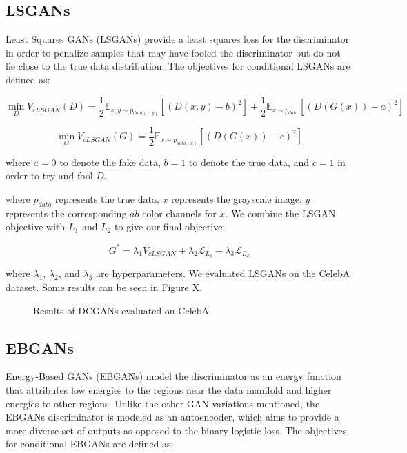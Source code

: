 \documentclass{article} %
\begin{document}

\subsection{LSGANs}
Least Squares GANs (LSGANs) provide a least squares loss for the discriminator in order to penalize samples
that may have fooled the discriminator but do not lie close to the true data distribution. The objectives
for conditional LSGANs are defined as:

\[\min\limits_{D} V_{cLSGAN}(D) = \frac{1}{2} \mathbb{E}_{x,y \sim p_{data(x,y)}} [(D(x,y)-b) ^2] +
\frac{1}{2} \mathbb{E}_{x \sim p_{data}}[(D(G(x)) - a)^2] \]

\[\min\limits_{G} V_{cLSGAN}(G) = \frac{1}{2} \mathbb{E}_{x \sim p_{data(x)}} [(D(G(x))-c)^2] \]

\noindent where $a=0$ to denote the fake data, $b=1$ to denote the true data, and $c=1$ in order to try and
fool $D$. 

\noindent where $p_{data}$ represents the true data, $x$ represents the grayscale image, $y$ represents
the corresponding $ab$ color channels for $x$. 
We combine the LSGAN objective with $L_1$ and $L_2$ to give our final objective:

\[ G^* = \lambda_1 V_{cLSGAN} + \lambda_2 \mathcal{L}_{L_1} + \lambda_3 \mathcal{L}_{L_2} \]

\noindent where $\lambda_1$, $\lambda_2$, and $\lambda_3$ are hyperparameters. We evaluated LSGANs on
the CelebA dataset. Some results can be seen in Figure X.

\begin{figure}[h]
   \centering
   \caption{Results of DCGANs evaluated on CelebA}
   \label{fi}
\end{figure}  

\subsection{EBGANs}
Energy-Based GANs (EBGANs) model the discriminator as an energy function that attributes low energies to
the regions near the data manifold and higher energies to other regions. Unlike the other GAN variations
mentioned, the EBGANs discriminator is modeled as an autoencoder, which aims to provide a more diverse
set of outputs as opposed to the binary logistic loss. 
The objectives for conditional EBGANs are defined as:
\end{document}
